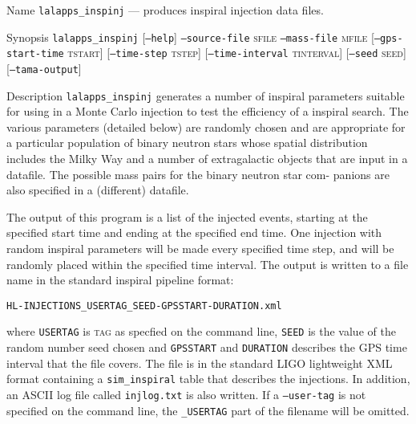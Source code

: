 \begin{entry}
\item[Name]
\verb$lalapps_inspinj$ --- produces inspiral injection data files.

\item[Synopsis]
\verb$lalapps_inspinj$ \quad
%
[\texttt{--help}]\quad
\texttt{--source-file} \textsc{sfile} \quad
\texttt{--mass-file} \textsc{mfile}\newline
%
[\texttt{--gps-start-time} \textsc{tstart}]\newline
%
[\texttt{--time-step} \textsc{tstep}]
[\texttt{--time-interval} \textsc{tinterval}]\newline
%
[\texttt{--seed} \textsc{seed}]\newline
%
[\texttt{--tama-output}]

\item[Description] 
\verb$lalapps_inspinj$
generates a number of inspiral  parameters suitable  for using in a Monte
Carlo injection to test the efficiency of a inspiral search.  The  various
parameters (detailed  below)  are randomly chosen and are appropriate for a
particular population of binary neutron stars  whose spatial  distribution
includes the Milky Way and a number of extragalactic objects that are  input
in  a  datafile.  The  possible  mass pairs for the binary neutron star com-
panions are also specified in a (different) datafile.

The output of this program  is  a  list  of  the  injected events,  starting
at  the specified start time and ending at the specified end time.  One 
injection with random inspiral parameters will be made every specified time
step, and will be randomly placed within the specified time interval.  
The output is written to a file name in the standard inspiral pipeline format:
\begin{center}
\begin{verbatim}
HL-INJECTIONS_USERTAG_SEED-GPSSTART-DURATION.xml
\end{verbatim}
\end{center}
where \verb$USERTAG$ is \textsc{tag} as specfied on the command line, 
\verb$SEED$ is the  value  of  the random number seed chosen and 
\verb$GPSSTART$ and \verb$DURATION$ describes the GPS time interval that
the file covers. The file is in the standard LIGO lightweight XML format
containing a \texttt{sim\_inspiral} table that describes the injections.
In addition, an ASCII log file called \verb$injlog.txt$ is also written.
If a \texttt{--user-tag} is not specified on the command line, the
\texttt{\_USERTAG} part of the filename will be omitted.


\end{entry}
